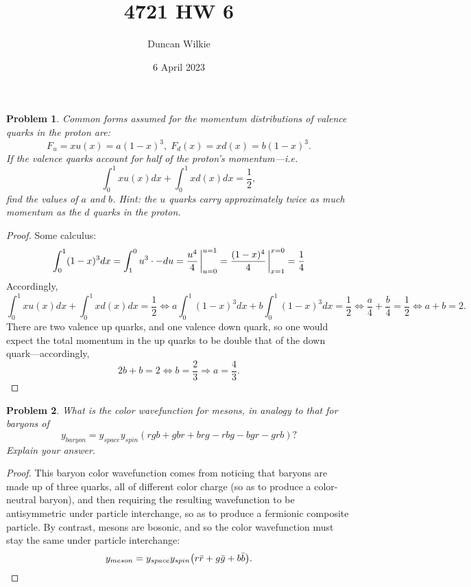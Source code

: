 \documentclass{article}
\title{4721 HW 6}
\author{Duncan Wilkie}
\date{6 April 2023}
\newtheorem{plm}{Problem}
\begin{document}
\maketitle

\begin{plm}
  Common forms assumed for the momentum distributions of valence quarks in the proton are:
  \[
    F_{u} = xu(x) = a(1 - x)^{3}, \; F_{d}(x) = xd(x) = b(1 - x)^{3}.
  \]
  If the valence quarks account for half of the proton's momentum---i.e.
  \[
    \int_{0}^{1}xu(x)dx + \int_{0}^{1}xd(x)dx = \frac{1}{2},
  \]
  find the values of $a$ and $b$.
  Hint: the $u$ quarks carry approximately twice as much momentum as the $d$ quarks in the proton.
\end{plm}

\begin{proof}
  Some calculus:
  \[
    \int_{0}^{1}(1 - x)^{3}dx = \int_{1}^{0}u^{3} \cdot -du = \frac{u^{4}}{4}\eval_{u=0}^{u=1} = \frac{(1 - x)^{4}}{4}\eval_{x=1}^{x=0}
    = \frac{1}{4}
  \]
  Accordingly,
  \[
    \int_{0}^{1}xu(x)dx + \int_{0}^{1}xd(x)dx = \frac{1}{2}
    \Leftrightarrow a\int_{0}^{1}(1 - x)^{3}dx + b\int_{0}^{1}(1 - x)^{3}dx = \frac{1}{2}
    \Leftrightarrow \frac{a}{4} + \frac{b}{4} = \frac{1}{2}
    \Leftrightarrow a + b = 2.
  \]
  There are two valence up quarks, and one valence down quark, so one would expect the total momentum in the up quarks to be double
  that of the down quark---accordingly,
  \[
    2b + b = 2 \Leftrightarrow b = \frac{2}{3} \Rightarrow a = \frac{4}{3}.
  \]
\end{proof}

\begin{plm}
  What is the color wavefunction for mesons, in analogy to that for baryons of
  \[
    y_{baryon} = y_{space}y_{spin}(rgb + gbr + brg - rbg - bgr - grb)?
  \]
  Explain your answer.
\end{plm}

\begin{proof}
  This baryon color wavefunction comes from noticing that baryons are made up of three quarks, all of different color charge
  (so as to produce a color-neutral baryon), and then requiring the resulting wavefunction to be antisymmetric under particle interchange,
  so as to produce a fermionic composite particle.
  By contrast, mesons are bosonic, and so the color wavefunction must stay the same under particle interchange:
  \[
    y_{meson} = y_{space}y_{spin}\qty(r\bar{r} + g\bar{g} + b\bar{b}).
  \]
\end{proof}
\end{document}
